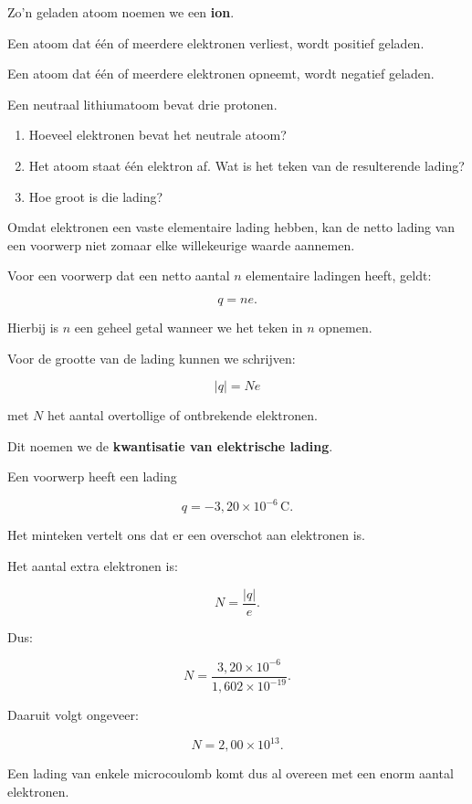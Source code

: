 \documentclass{ximera}
\begin{document}
Zo'n geladen atoom noemen we een \textbf{ion}.

Een atoom dat één of meerdere elektronen verliest, wordt positief
geladen.

Een atoom dat één of meerdere elektronen opneemt, wordt negatief
geladen.


\begin{oefening}[Lithium]{\oefB}

Een neutraal lithiumatoom bevat drie protonen.

\begin{enumerate}
  \item Hoeveel elektronen bevat het neutrale atoom?
  \item Het atoom staat één elektron af. Wat is het teken van de
        resulterende lading?
  \item Hoe groot is die lading?
\end{enumerate}

\end{oefening}




Omdat elektronen een vaste elementaire lading hebben, kan de netto
lading van een voorwerp niet zomaar elke willekeurige waarde aannemen.

Voor een voorwerp dat een netto aantal $n$ elementaire ladingen heeft,
geldt:

\[
\boxed{
q=ne.
}
\]

Hierbij is $n$ een geheel getal wanneer we het teken in $n$ opnemen.

Voor de grootte van de lading kunnen we schrijven:

\[
\boxed{
|q|=Ne
}
\]

met $N$ het aantal overtollige of ontbrekende elektronen.


Dit noemen we de \textbf{kwantisatie van elektrische lading}.


\begin{voorbeeld}

Een voorwerp heeft een lading

\[
q=-3{,}20\times10^{-6}\,\mathrm C.
\]

Het minteken vertelt ons dat er een overschot aan elektronen is.

Het aantal extra elektronen is:

\[
N=\frac{|q|}{e}.
\]

Dus:

\[
N=
\frac{3{,}20\times10^{-6}}
{1{,}602\times10^{-19}}.
\]

Daaruit volgt ongeveer:

\[
\boxed{
N=2{,}00\times10^{13}.
}
\]

Een lading van enkele microcoulomb komt dus al overeen met een enorm
aantal elektronen.

\end{voorbeeld}
\end{document}
